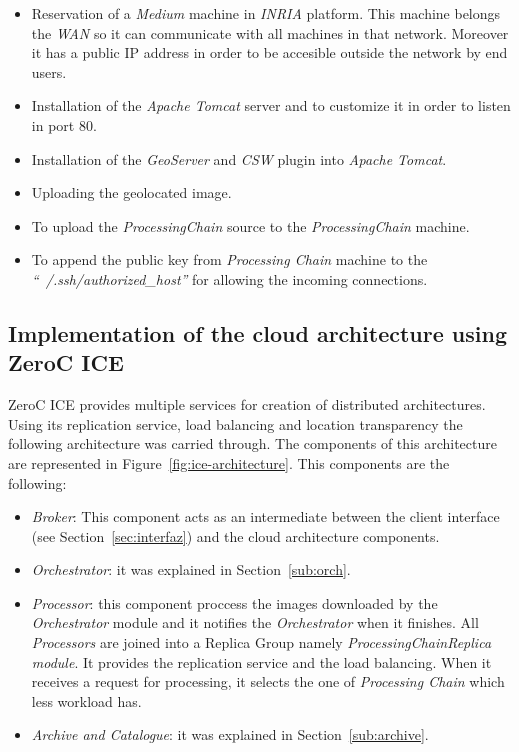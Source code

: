 \begin{itemize}
 \item Reservation of a \emph{Medium} machine in \emph{INRIA} \bonfire
   platform. This machine belongs the \bonfire \emph{WAN} so it can communicate
   with all machines in that network. Moreover it has a public \ac{IP} address
   in order to be accesible outside the \bonfire network by end users. 
 \item Installation of the \emph{Apache Tomcat} server and to customize it in
   order to listen in port 80.
 \item Installation of the \emph{GeoServer} and \emph{CSW} plugin into
   \emph{Apache Tomcat}.
 \item Uploading the geolocated image.
 \item To upload the \emph{ProcessingChain} source to the \emph{ProcessingChain}
   machine.
 \item To append the public key from \emph{Processing Chain} machine to the
   \emph{``~/.ssh/authorized\_host''} for
   allowing the incoming connections.
\end{itemize}


\subsection{Implementation of the cloud architecture using ZeroC ICE}

ZeroC ICE provides multiple services for creation of distributed
architectures. Using its replication service, load balancing and location
transparency the following architecture was carried through. The components of
this architecture are represented in Figure~\ref{fig:ice-architecture}. This components are the
following:

\begin{itemize}
\item \emph{Broker}: This component acts as an intermediate between the client
  interface (see Section~\ref{sec:interfaz}) and the cloud architecture
  components. 
\item \emph{Orchestrator}: it was explained in Section~\ref{sub:orch}.
\item \emph{Processor}: this component proccess the images downloaded by the
  \emph{Orchestrator} module and it notifies the \emph{Orchestrator} when it
  finishes. All \emph{Processors} are joined into a Replica Group namely
  \emph{ProcessingChainReplica module}. It provides the replication service and the load
  balancing. When it receives a request for processing, it selects the one of \emph{Processing Chain} which less workload has.
\item \emph{Archive and Catalogue}: it was explained in Section~\ref{sub:archive}.
\end{itemize}

